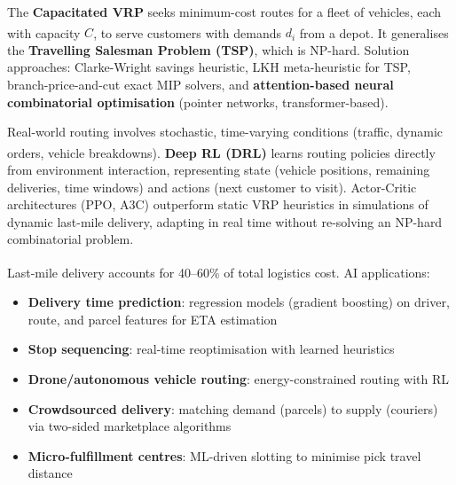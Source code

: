 \begin{tcbitemize}[ skin=sectionraster ]

    \tcbitem[title={Vehicle Routing Problem (VRP)}, raster multicolumn=3]
    The \textbf{Capacitated VRP} seeks minimum-cost routes for a fleet of vehicles, each with capacity $C$, to serve customers with demands $d_i$ from a depot\textsuperscript{\cite[][pp.~420--440]{hillierIntroductionOperationsResearch2020}}.
    It generalises the \textbf{Travelling Salesman Problem (TSP)}, which is NP-hard.
    Solution approaches: Clarke-Wright savings heuristic, LKH meta-heuristic for TSP, branch-price-and-cut exact MIP solvers, and \textbf{attention-based neural combinatorial optimisation} (pointer networks, transformer-based).

    \tcbitem[title=Dynamic Routing with Reinforcement Learning, raster multicolumn=3]
    Real-world routing involves stochastic, time-varying conditions (traffic, dynamic orders, vehicle breakdowns)\textsuperscript{\cite[][pp.~1--3]{panJobShopSchedulingRL2021}}.
    \textbf{Deep RL (DRL)} learns routing policies directly from environment interaction, representing state (vehicle positions, remaining deliveries, time windows) and actions (next customer to visit).
    Actor-Critic architectures (PPO, A3C) outperform static VRP heuristics in simulations of dynamic last-mile delivery, adapting in real time without re-solving an NP-hard combinatorial problem.

    \tcbitem[title=Last-Mile Delivery, raster multicolumn=6]
    Last-mile delivery accounts for 40--60\% of total logistics cost\textsuperscript{\cite[][pp.~444--448]{chopraSupplyChainManagement2019}}.
    AI applications:
    \begin{itemize}
        \item \textbf{Delivery time prediction}: regression models (gradient boosting) on driver, route, and parcel features for ETA estimation
        \item \textbf{Stop sequencing}: real-time reoptimisation with learned heuristics
        \item \textbf{Drone/autonomous vehicle routing}: energy-constrained routing with RL
        \item \textbf{Crowdsourced delivery}: matching demand (parcels) to supply (couriers) via two-sided marketplace algorithms
        \item \textbf{Micro-fulfillment centres}: ML-driven slotting to minimise pick travel distance
    \end{itemize}

\end{tcbitemize}


